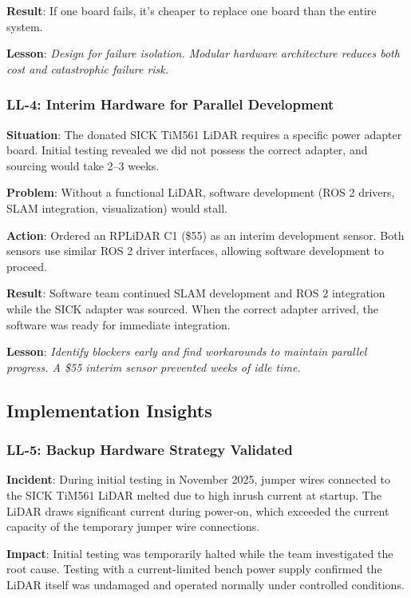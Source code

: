 \textbf{Result}: If one board fails, it's cheaper to replace one board than the entire system.

\textbf{Lesson}: \textit{Design for failure isolation. Modular hardware architecture reduces both cost and catastrophic failure risk.}

\subsubsection{LL-4: Interim Hardware for Parallel Development}

\textbf{Situation}: The donated SICK TiM561 LiDAR requires a specific power adapter board. Initial testing revealed we did not possess the correct adapter, and sourcing would take 2--3 weeks.

\textbf{Problem}: Without a functional LiDAR, software development (ROS 2 drivers, SLAM integration, visualization) would stall.

\textbf{Action}: Ordered an RPLiDAR C1 (\$55) as an interim development sensor. Both sensors use similar ROS 2 driver interfaces, allowing software development to proceed.

\textbf{Result}: Software team continued SLAM development and ROS 2 integration while the SICK adapter was sourced. When the correct adapter arrived, the software was ready for immediate integration.

\textbf{Lesson}: \textit{Identify blockers early and find workarounds to maintain parallel progress. A \$55 interim sensor prevented weeks of idle time.}

\subsection{Implementation Insights}

\subsubsection{LL-5: Backup Hardware Strategy Validated}

\textbf{Incident}: During initial testing in November 2025, jumper wires connected to the SICK TiM561 LiDAR melted due to high inrush current at startup. The LiDAR draws significant current during power-on, which exceeded the current capacity of the temporary jumper wire connections.

\textbf{Impact}: Initial testing was temporarily halted while the team investigated the root cause. Testing with a current-limited bench power supply confirmed the LiDAR itself was undamaged and operated normally under controlled conditions.

